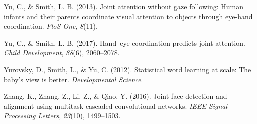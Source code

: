 \documentclass[english,man,floatsintext]{apa6}
\begin{document}
\hypertarget{ref-yu2013joint}{}
Yu, C., \& Smith, L. B. (2013). Joint attention without gaze following:
Human infants and their parents coordinate visual attention to objects
through eye-hand coordination. \emph{PloS One}, \emph{8}(11).

\hypertarget{ref-yu2017hand}{}
Yu, C., \& Smith, L. B. (2017). Hand--eye coordination predicts joint
attention. \emph{Child Development}, \emph{88}(6), 2060--2078.

\hypertarget{ref-yurovsky2012}{}
Yurovsky, D., Smith, L., \& Yu, C. (2012). Statistical word learning at
scale: The baby's view is better. \emph{Developmental Science}.

\hypertarget{ref-zhang2016}{}
Zhang, K., Zhang, Z., Li, Z., \& Qiao, Y. (2016). Joint face detection
and alignment using multitask cascaded convolutional networks.
\emph{IEEE Signal Processing Letters}, \emph{23}(10), 1499--1503.

\endgroup
\end{document}
